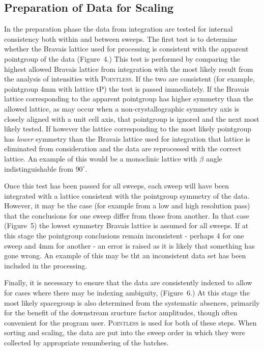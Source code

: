 \documentclass[a4paper, 11pt]{article}
\begin{document}
\subsection{Preparation of Data for Scaling}

In the preparation phase the data from integration are tested for
internal consistency both within and between sweeps. The first test is
to determine whether the Bravais lattice used for processing is
consistent with the apparent pointgroup of the data
(Figure~4.)
This test is performed by comparing the highest allowed Bravais
lattice from integration with the most likely result from 
the analysis of intensities with \textsc{Pointless}. If
the two are consistent (for example, pointgroup 4mm with lattice tP)
the test is passed immediately. If the Bravais lattice corresponding
to the apparent pointgroup has higher
symmetry than the allowed lattice, as may occur when a
non-crystallographic symmetry axis is closely aligned with a unit cell
axis, that pointgroup is ignored and the next most likely tested. 
If however the lattice corresponding to the most likely pointgroup has 
\emph{lower} symmetry than the
Bravais lattice used for integration that lattice is eliminated from
consideration and the data are reprocessed with the correct lattice.
An example of this would
be a monoclinic lattice with $\beta$ angle indistinguishable
from $90^{\circ}$. 

Once this test has been passed for all sweeps, each sweep will have been
integrated with a lattice consistent with the pointgroup symmetry of
the data. However, it may be the case (for example from a low and high
resolution pass) that the conclusions for one sweep differ from those
from another. In that case (Figure~5) the lowest
symmetry Bravais lattice
is assumed for all sweeps. If at this stage the pointgroup
conclusions remain inconsistent - perhaps 4 for one sweep and 
4mm for another - an error is raised as it is likely
that something has gone wrong. An example of this may be tht an
inconsistent data set has been included in the processing. 

Finally, it is necessary to ensure that the data are consistently
indexed to allow for cases where there may be indexing ambiguity,
(Figure~6.) At this stage the most likely
spacegroup is also determined from the systematic absences, primarily
for the benefit of the downstream sructure factor amplitudes, though
often convenient for the program user. \textsc{Pointless} is used for
both of these steps. When sorting and scaling, the
data are put into the sweep order in which they were collected by
appropriate renumbering of the batches.
\end{document}
